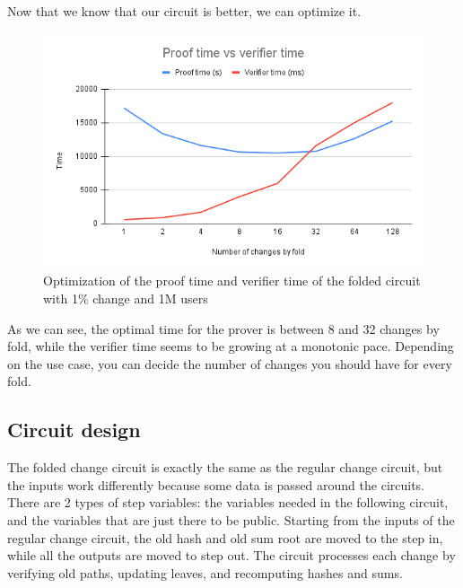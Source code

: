 Now that we know that our circuit is better, we can optimize it.

\begin{figure}[H]
   \centering
   \includegraphics[width=130mm]{Proof time vs verifier time.png}
   \caption{Optimization of the proof time and verifier time of the folded circuit with 1\% change and 1M users}
   \label{overflow}
   \end{figure}

As we can see, the optimal time for the prover is between 8 and 32 changes by fold, while the verifier time seems to be growing at a monotonic pace.
Depending on the use case, you can decide the number of changes you should have for every fold.

\subsection{Circuit design}
The folded change circuit is exactly the same as the regular change circuit, but the inputs work differently because some data is passed around the circuits.
There are 2 types of step variables: the variables needed in the following circuit, and the variables that are just there to be public.
Starting from the inputs of the regular change circuit, the old hash and old sum root are moved to the step in, while all the outputs are moved to step out. 
The circuit processes each change by verifying old paths, updating leaves, and recomputing hashes and sums.

